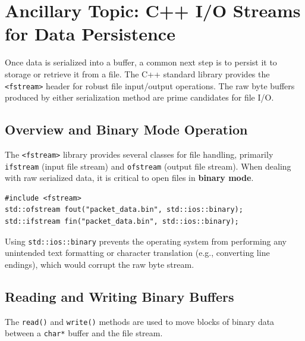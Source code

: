 \documentclass{article}
\begin{document}
\section[C++ I/O Streams for Data Persistence]{Ancillary Topic: C++ I/O Streams for Data Persistence}

Once data is serialized into a buffer, a common next step is to persist it to storage or retrieve it from a file. The C++ standard library provides the \texttt{<fstream>} header for robust file input/output operations. The raw byte buffers produced by either serialization method are prime candidates for file I/O.

\subsection{Overview and Binary Mode Operation}

The \texttt{<fstream>} library provides several classes for file handling, primarily \texttt{ifstream} (input file stream) and \texttt{ofstream} (output file stream). When dealing with raw serialized data, it is critical to open files in \textbf{binary mode}.

\begin{center}
\begin{verbatim}
#include <fstream>
std::ofstream fout("packet_data.bin", std::ios::binary);
std::ifstream fin("packet_data.bin", std::ios::binary);
\end{verbatim}
\end{center}

Using \texttt{std::ios::binary} prevents the operating system from performing any unintended text formatting or character translation (e.g., converting line endings), which would corrupt the raw byte stream.

\subsection{Reading and Writing Binary Buffers}

The \texttt{read()} and \texttt{write()} methods are used to move blocks of binary data between a \texttt{char*} buffer and the file stream.
\end{document}
